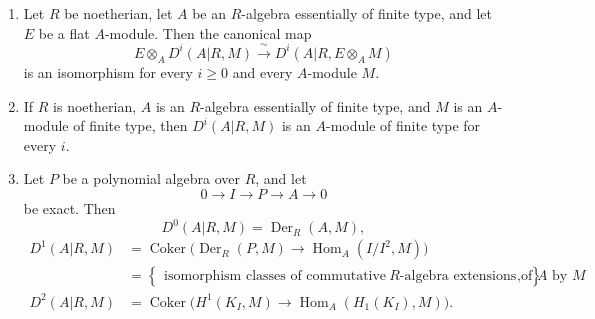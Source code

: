 \begin{enumerate}[label=(\arabic*)]

\item Let $R$ be noetherian, let $A$ be an $R$-algebra essentially
of finite type, and let $E$ be a flat $A$-module. Then the canonical
map
\[
 E\otimes_AD^i(A|R,M)
 \xrightarrow{\ \sim\ }
 D^i(A|R,E\otimes_AM)
\]
is an isomorphism for every $i\geq0$ and every $A$-module $M$.

\item If $R$ is noetherian, $A$ is an $R$-algebra essentially of
finite type, and $M$ is an $A$-module of finite type, then
$D^i(A|R,M)$ is an $A$-module of finite type for every $i$.

\item Let $P$ be a polynomial algebra over $R$, and let
\[
 0\longrightarrow I\longrightarrow P\longrightarrow A
 \longrightarrow0
\]
be exact. Then
\[
 D^0(A|R,M)=\operatorname{Der}_R(A,M),
\]
\begin{align*}
D^1(A|R,M)
 &=\operatorname{Coker}\bigl(
   \operatorname{Der}_R(P,M)\longrightarrow
   \operatorname{Hom}_A(I/I^2,M)\bigr)\\
 &=\left\{
   \begin{array}{c}
   \text{isomorphism classes of commutative}\
   R\text{-algebra extensions of }A\text{ by }M
   \end{array}\right\},\\
D^2(A|R,M)
 &=\operatorname{Coker}\bigl(
   H^1(K_I,M)\longrightarrow
   \operatorname{Hom}_A(H_1(K_I),M)\bigr).
\end{align*}
\end{enumerate}
